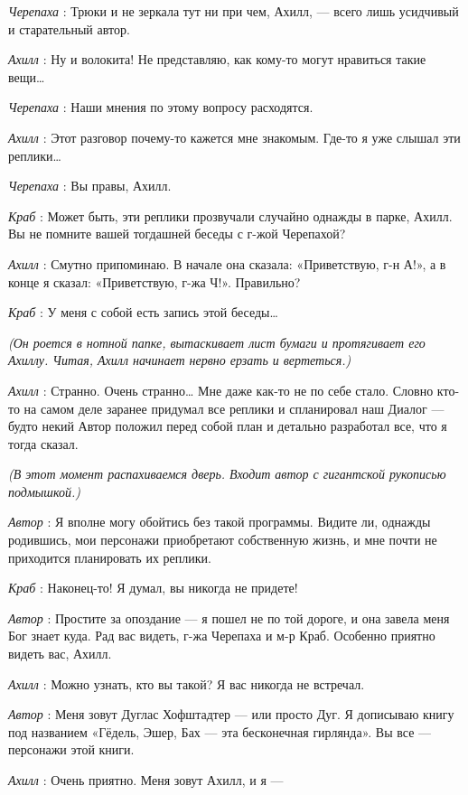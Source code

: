 \emph{Черепаха} : Трюки и не зеркала тут ни при чем, Ахилл, --- всего лишь усидчивый и старательный автор.

\emph{Ахилл} : Ну и волокита! Не представляю, как кому-то могут нравиться такие вещи\ldots{}

\emph{Черепаха} : Наши мнения по этому вопросу расходятся.

\emph{Ахилл} : Этот разговор почему-то кажется мне знакомым. Где-то я уже слышал эти реплики\ldots{}

\emph{Черепаха} : Вы правы, Ахилл.

\emph{Краб} : Может быть, эти реплики прозвучали случайно однажды в парке, Ахилл. Вы не помните вашей тогдашней беседы с г-жой Черепахой?

\emph{Ахилл} : Смутно припоминаю. В начале она сказала: «Приветствую, г-н А!», а в конце я сказал: «Приветствую, г-жа Ч!». Правильно?

\emph{Краб} : У меня с собой есть запись этой беседы\ldots{}

\emph{(Он роется в нотной папке, вытаскивает лист бумаги и протягивает его Ахиллу. Читая, Ахилл начинает нервно ерзать и вертеться.)}

\emph{Ахилл} : Странно. Очень странно\ldots{} Мне даже как-то не по себе стало. Словно кто-то на самом деле заранее придумал все реплики и спланировал наш Диалог --- будто некий Автор положил перед собой план и детально разработал все, что я тогда сказал.

\emph{(В этот момент распахиваемся дверь. Входит автор с гигантской рукописью подмышкой.)}

\emph{Автор} : Я вполне могу обойтись без такой программы. Видите ли, однажды родившись, мои персонажи приобретают собственную жизнь, и мне почти не приходится планировать их реплики.

\emph{Краб} : Наконец-то! Я думал, вы никогда не придете!

\emph{Автор} : Простите за опоздание --- я пошел не по той дороге, и она завела меня Бог знает куда. Рад вас видеть, г-жа Черепаха и м-р Краб. Особенно приятно видеть вас, Ахилл.

\emph{Ахилл} : Можно узнать, кто вы такой? Я вас никогда не встречал.

\emph{Автор} : Меня зовут Дуглас Хофштадтер --- или просто Дуг. Я дописываю книгу под названием «Гёдель, Эшер, Бах --- эта бесконечная гирлянда». Вы все --- персонажи этой книги.

\emph{Ахилл} : Очень приятно. Меня зовут Ахилл, и я ---

